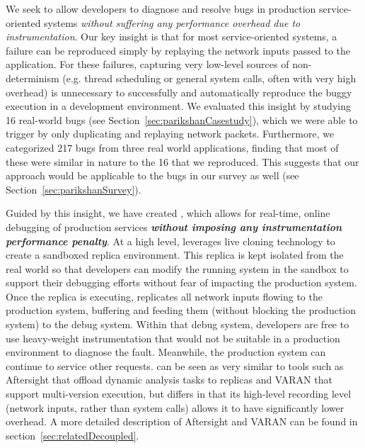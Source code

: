We seek to allow developers to diagnose and resolve bugs in production service-oriented systems \emph{without suffering any performance overhead due to instrumentation}.
Our key insight is that for most service-oriented systems, a failure can be reproduced simply by replaying the network inputs passed to the application.
For these failures, capturing very low-level sources of non-determinism (e.g. thread scheduling or general system calls, often with very high overhead) is unnecessary to successfully and automatically reproduce the buggy execution in a development environment.
We evaluated this insight by studying 16 real-world bugs (see Section~\ref{sec:parikshanCasestudy}), which we were able to trigger by only duplicating and replaying network packets.
Furthermore, we categorized 217 bugs from three real world applications, finding that most of these were similar in nature to the 16 that we reproduced. 
This suggests that our approach would be applicable to the bugs in our survey as well (see Section~\ref{sec:parikshanSurvey}).


Guided by this insight, we have created \parikshan, which allows for real-time, online debugging of production services \textbf{\emph{without imposing any instrumentation performance penalty}}.
At a high level, \parikshan leverages live cloning technology to create a sandboxed replica environment.
This replica is kept isolated from the real world so that developers can modify the running system in the sandbox to support their debugging efforts without fear of impacting the production system.
Once the replica is executing, \parikshan replicates all network inputs flowing to the production system, buffering and feeding them (without blocking the production system) to the debug system.
Within that debug system, developers are free to use heavy-weight instrumentation that would not be suitable in a production environment to diagnose the fault.
Meanwhile, the production system can continue to service other requests.
\parikshan can be seen as very similar to tools such as Aftersight \cite{aftersight} that offload dynamic analysis tasks to replicas and VARAN \cite{Hosek:2015:VUE:2694344.2694390} that support multi-version execution, but differs in that its high-level recording level (network inputs, rather than system calls) allows it to have significantly lower overhead. A more detailed description of Aftersight and VARAN can be found in section~\ref{sec:relatedDecoupled}.


